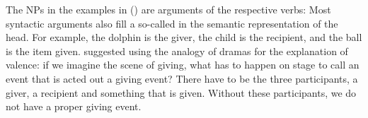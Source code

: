 The NPs in the examples in () are arguments of the respective verbs:
\eal
{}
\zl
Most syntactic arguments also fill a so-called  in the semantic representation of the
head. For example, the dolphin is the giver, the child is the recipient, and the ball is the item
given. \citet[Chapter~48]{Tesniere2015a-u} suggested using the analogy of dramas for the explanation of valence: if we
imagine the scene of giving, what has to happen on stage to call an event that is acted out a giving
event? There have to be the three participants, a giver, a recipient and something that is
given. Without these participants, we do not have a proper giving event. 

